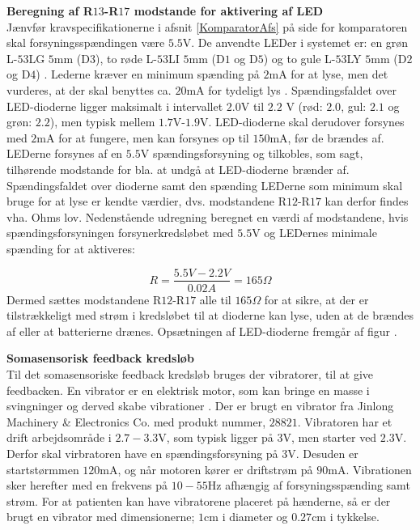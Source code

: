 
\noindent\textbf{Beregning af R$13$-R$17$ modstande for aktivering af LED} \\
Jænvfør kravspecifikationerne i afsnit \ref{KomparatorAfs} på side \pageref{KomparatorAfs} for komparatoren skal forsyningsspændingen være $5.5$V. De anvendte LEDer i systemet er: en grøn L-$53$LG $5$mm (D$3$), to røde L-$53$LI $5$mm (D$1$ og D$5$) og to gule L-$53$LY $5$mm (D$2$ og D$4$) . Lederne kræver en minimum spænding på $2$mA for at lyse, men det vurderes, at der skal benyttes ca. $20$mA for tydeligt lys .  Spændingsfaldet over LED-dioderne ligger maksimalt i intervallet $2.0$V til $2.2$ V (rød: $2.0$, gul: $2.1$ og grøn: $2.2$), men typisk mellem $1.7$V-$1.9$V. LED-dioderne skal derudover forsynes med $2$mA for at fungere, men kan forsynes op til $150$mA, før de brændes af. LEDerne forsynes af en $5.5$V spændingsforsyning og tilkobles, som sagt, tilhørende modstande for bla. at undgå at LED-dioderne brænder af. Spændingsfaldet over dioderne samt den spænding LEDerne som minimum skal bruge for at lyse er kendte værdier, dvs. modstandene R$12$-R$17$ kan derfor findes vha. Ohms lov. Nedenstående udregning beregnet en værdi af modstandene, hvis spændingsforsyningen forsynerkredsløbet med $5.5$V og LEDernes minimale spænding for at aktiveres:

\begin{equation}
R = \dfrac{5.5V - 2.2V}{0.02A} = 165\Omega
\end{equation}
\noindent Dermed sættes modstandene R$12$-R$17$ alle til $165\Omega$ for at sikre, at der er tilstrækkeligt med strøm i kredsløbet til at dioderne kan lyse, uden at de brændes af eller at batterierne drænes. Opsætningen af LED-dioderne fremgår af figur . 

\noindent\textbf{Somasensorisk feedback kredsløb} \\
Til det somasensoriske feedback kredsløb bruges der vibratorer, til at give feedbacken. En vibrator er en elektrisk motor, som kan bringe en masse i svingninger og derved skabe vibrationer
 \cite{Radaktionen2009}. Der er brugt en vibrator fra Jinlong Machinery & Electronics Co. med produkt nummer, $28821$. Vibratoren har et drift arbejdsområde i $2.7-3.3$V, som typisk ligger på $3$V, men starter ved $2.3$V. Derfor skal virbratoren have en spændingsforsyning på $3$V.  Desuden er startstørmmen $120$mA, og når motoren kører er driftstrøm på $90$mA. Vibrationen sker herefter med en frekvens på $10-55$Hz afhængig af forsyningsspænding samt strøm. For at patienten kan have vibratorene placeret på hænderne, så er der brugt en vibrator med dimensionerne; $1$cm i diameter og $0.27$cm i tykkelse.   
 
